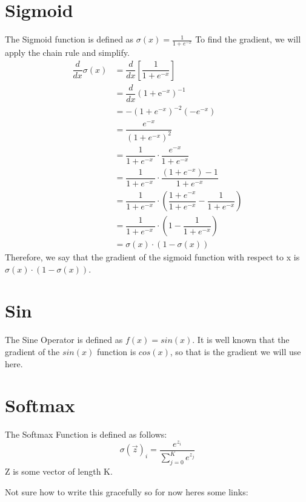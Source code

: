 \documentclass{article}
\begin{document}
    \section{Sigmoid}
        The Sigmoid function is defined as $\sigma(x) = \frac{1}{1+e^{-x}}$ To find the gradient, we will apply the chain rule and simplify.
        \begin{align}
            \dfrac{d}{dx} \sigma(x) &= \dfrac{d}{dx} \left[ \dfrac{1}{1 + e^{-x}} \right]\\
            &= \dfrac{d}{dx} \left( 1 + \mathrm{e}^{-x} \right)^{-1} \\
            &= -(1 + e^{-x})^{-2}(-e^{-x}) \\
            &= \dfrac{e^{-x}}{\left(1 + e^{-x}\right)^2} \\
            &= \dfrac{1}{1 + e^{-x}\ } \cdot \dfrac{e^{-x}}{1 + e^{-x}}  \\
            &= \dfrac{1}{1 + e^{-x}\ } \cdot \dfrac{(1 + e^{-x}) - 1}{1 + e^{-x}}  \\
            &= \dfrac{1}{1 + e^{-x}\ } \cdot \left( \dfrac{1 + e^{-x}}{1 + e^{-x}} - \dfrac{1}{1 + e^{-x}} \right) \\
            &= \dfrac{1}{1 + e^{-x}\ } \cdot \left( 1 - \dfrac{1}{1 + e^{-x}} \right) \\
            &= \sigma(x) \cdot (1 - \sigma(x))
        \end{align}
    Therefore, we say that the gradient of the sigmoid function with respect to x is $\sigma(x) \cdot (1-\sigma(x))$.

\noindent\makebox[\linewidth]{\rule{\paperwidth}{0.4pt}}
    \section{Sin}
        The Sine Operator is defined as $f(x) = sin(x)$. It is well known that the gradient of the $sin(x)$ function
        is $cos(x)$, so that is the gradient we will use here.
        
\noindent\makebox[\linewidth]{\rule{\paperwidth}{0.4pt}}
    \section{Softmax}
        The Softmax Function is defined as follows:
        $$\sigma(\vec z)_i = \frac{e^{z_i}}{\sum_{j=0}^{K} e^{z_j}}$$
        Z is some vector of length K. 

        Not sure how to write this gracefully so for now heres some links:
\end{document}
